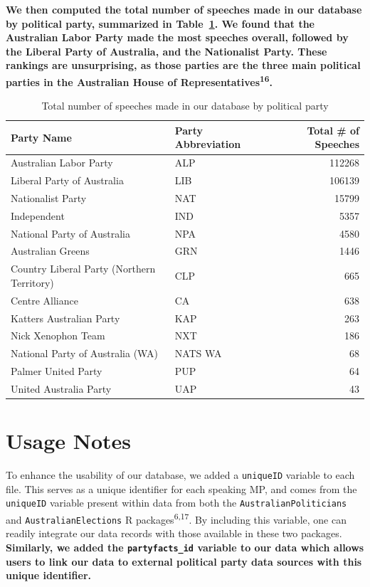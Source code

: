 \documentclass[
  letterpaper,
  DIV=11,
  numbers=noendperiod]{scrartcl}
\begin{document}
\textbf{We then computed the total number of speeches made in our
database by political party, summarized in
Table~\ref{tbl-speeches_by_party}. We found that the Australian Labor
Party made the most speeches overall, followed by the Liberal Party of
Australia, and the Nationalist Party. These rankings are unsurprising,
as those parties are the three main political parties in the Australian
House of Representatives\textsuperscript{16}.}

\hypertarget{tbl-speeches_by_party}{}
\begin{table}[H]
\caption{\label{tbl-speeches_by_party}Total number of speeches made in our database by political party }\tabularnewline

\centering
\begin{tabular}{llr}
\toprule
Party Name & Party Abbreviation & Total \# of Speeches\\
\midrule
Australian Labor Party & ALP & 112268\\
Liberal Party of Australia & LIB & 106139\\
Nationalist Party & NAT & 15799\\
Independent & IND & 5357\\
National Party of Australia & NPA & 4580\\
\addlinespace
Australian Greens & GRN & 1446\\
Country Liberal Party (Northern Territory) & CLP & 665\\
Centre Alliance & CA & 638\\
Katters Australian Party & KAP & 263\\
Nick Xenophon Team & NXT & 186\\
\addlinespace
National Party of Australia (WA) & NATS WA & 68\\
Palmer United Party & PUP & 64\\
United Australia Party & UAP & 43\\
\bottomrule
\end{tabular}
\end{table}

\hypertarget{sec-usage}{%
\section{Usage Notes}\label{sec-usage}}

To enhance the usability of our database, we added a \texttt{uniqueID}
variable to each file. This serves as a unique identifier for each
speaking MP, and comes from the \texttt{uniqueID} variable present
within data from both the \texttt{AustralianPoliticians} and
\texttt{AustralianElections} R packages\textsuperscript{6,17}. By
including this variable, one can readily integrate our data records with
those available in these two packages. \textbf{Similarly, we added the
\texttt{partyfacts\_id} variable to our data which allows users to link
our data to external political party data sources with this unique
identifier.}
\end{document}
